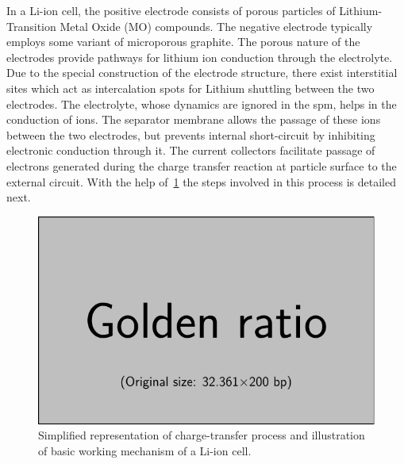 In  a Li-ion  cell,  the  positive electrode  consists  of  porous particles  of
Lithium-Transition Metal Oxide (MO)  compounds. The negative electrode typically
employs  some  variant  of  microporous  graphite.  The  porous  nature  of  the
electrodes provide pathways for lithium  ion conduction through the electrolyte.
Due  to  the  special  construction  of the  electrode  structure,  there  exist
interstitial  sites  which act  as  intercalation  spots for  Lithium  shuttling
between the two  electrodes. The electrolyte, whose dynamics are  ignored in the
\gls{spm}, helps  in the  conduction of   ions. The  separator membrane
allows  the passage  of  these ions  between the  two  electrodes, but  prevents
internal  short-circuit  by inhibiting  electronic  conduction  through it.  The
current collectors facilitate  passage of electrons generated  during the charge
transfer reaction  at particle surface  to the  external circuit. With  the help
of~\cref{fig:chargetransferprocess}  the  steps  involved  in  this  process  is
detailed next.

\begin{figure}[!htbp]
    \centering
    \includegraphics{placeholder_images/example-image-golden.pdf}
    \caption[Charge-transer and basic working mechanism of a Li-ion cell]{Simplified representation of charge-transfer
    process and illustration of basic working mechanism of a Li-ion cell.}
    \label{fig:chargetransferprocess}
\end{figure}

